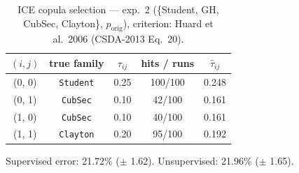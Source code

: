 \begin{table}[htbp]
  \centering
  \caption{ICE copula selection — exp.\ 2 (\{Student, GH, CubSec, Clayton\}, $p_{\text{orig}}$), criterion: Huard et al.\ 2006 (CSDA-2013 Eq.\ 20).}
  \label{tab:exp3-exp2_orig_p__huard}
  \begin{tabular}{ccccc}
    \toprule
    $(i, j)$ & true family & $\tau_{ij}$ & hits / runs & $\hat\tau_{ij}$ \\
    \midrule
    (0, 0) & \texttt{Student} & 0.25 & 100/100 & 0.248 \\
    (0, 1) & \texttt{CubSec} & 0.10 & 42/100 & 0.161 \\
    (1, 0) & \texttt{CubSec} & 0.10 & 40/100 & 0.161 \\
    (1, 1) & \texttt{Clayton} & 0.20 & 95/100 & 0.192 \\
    \bottomrule
  \end{tabular}
  \par\smallskip Supervised error: 21.72\% ($\pm$ 1.62). Unsupervised: 21.96\% ($\pm$ 1.65).
\end{table}
